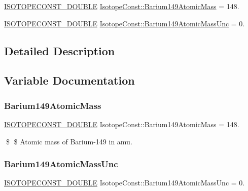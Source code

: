 \begin{DoxyCompactItemize}
\item 
\mbox{\hyperlink{group___isotope_const-_macros_ga8f45a7272ce02c0b4c65c44636ed719a}{I\+S\+O\+T\+O\+P\+E\+C\+O\+N\+S\+T\+\_\+\+D\+O\+U\+B\+LE}} \mbox{\hyperlink{group___isotope_const-_barium-_ba149_gad84e108177c7ec563c7935ffcd6b26af}{Isotope\+Const\+::\+Barium149\+Atomic\+Mass}} = 148.
\item 
\mbox{\hyperlink{group___isotope_const-_macros_ga8f45a7272ce02c0b4c65c44636ed719a}{I\+S\+O\+T\+O\+P\+E\+C\+O\+N\+S\+T\+\_\+\+D\+O\+U\+B\+LE}} \mbox{\hyperlink{group___isotope_const-_barium-_ba149_ga97038fd40387f457629f0e2500429603}{Isotope\+Const\+::\+Barium149\+Atomic\+Mass\+Unc}} = 0.
\end{DoxyCompactItemize}


\subsection{Detailed Description}


\subsection{Variable Documentation}
\mbox{\label{group___isotope_const-_barium-_ba149_gad84e108177c7ec563c7935ffcd6b26af}} 
\subsubsection{\texorpdfstring{Barium149\+Atomic\+Mass}{Barium149AtomicMass}}
{\footnotesize\ttfamily \mbox{\hyperlink{group___isotope_const-_macros_ga8f45a7272ce02c0b4c65c44636ed719a}{I\+S\+O\+T\+O\+P\+E\+C\+O\+N\+S\+T\+\_\+\+D\+O\+U\+B\+LE}} Isotope\+Const\+::\+Barium149\+Atomic\+Mass = 148.}

\$ \$ Atomic mass of Barium-\/149 in amu. \mbox{\label{group___isotope_const-_barium-_ba149_ga97038fd40387f457629f0e2500429603}} 
\subsubsection{\texorpdfstring{Barium149\+Atomic\+Mass\+Unc}{Barium149AtomicMassUnc}}
{\footnotesize\ttfamily \mbox{\hyperlink{group___isotope_const-_macros_ga8f45a7272ce02c0b4c65c44636ed719a}{I\+S\+O\+T\+O\+P\+E\+C\+O\+N\+S\+T\+\_\+\+D\+O\+U\+B\+LE}} Isotope\+Const\+::\+Barium149\+Atomic\+Mass\+Unc = 0.}

